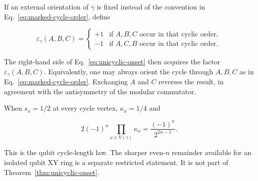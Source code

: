 If an external orientation of $\gamma$ is fixed instead of the convention in
Eq.~\eqref{eq:marked-cycle-order}, define

\begin{equation}
 \varepsilon_\gamma(A,B,C)=
 \begin{cases}
 +1 & \text{if $A,B,C$ occur in that cyclic order},\\
 -1 & \text{if $A,C,B$ occur in that cyclic order}.
 \end{cases}
 \label{eq:cyclic-order-sign}
\end{equation}

The right-hand side of Eq.~\eqref{eq:unicyclic-onset} then acquires the factor
$\varepsilon_\gamma(A,B,C)$.  Equivalently, one may always orient the cycle
through $A,B,C$ as in Eq.~\eqref{eq:marked-cycle-order}.  Exchanging $A$ and
$C$ reverses the result, in agreement with the antisymmetry of the modular
commutator.

When $s_x=1/2$ at every cycle vertex, $\kappa_x=1/4$ and

\begin{equation}
 2(-1)^n\prod_{x\in V(\gamma)}\kappa_x
 =\frac{(-1)^n}{2^{2n-1}}.
 \label{eq:qubit-unicyclic-specialization}
\end{equation}

This is the qubit cycle-length law.  The sharper even-$n$ remainder available
for an isolated qubit XY ring is a separate restricted statement.  It is not
part of Theorem~\ref{thm:unicyclic-onset}.
